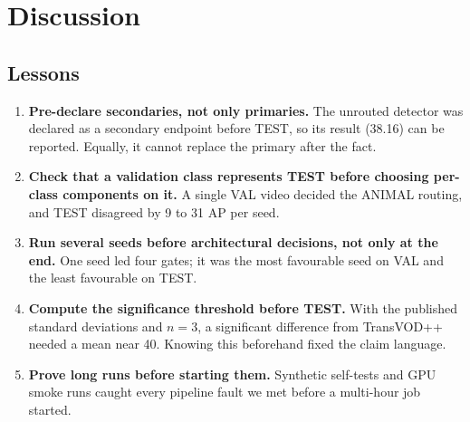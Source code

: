\section{Discussion}\label{sec:discussion}

\subsection{Lessons}
\begin{enumerate}
\item \textbf{Pre-declare secondaries, not only primaries.} The unrouted detector was declared as a secondary endpoint before TEST, so its result (38.16) can be reported. Equally, it cannot replace the primary after the fact.
\item \textbf{Check that a validation class represents TEST before choosing per-class components on it.} A single VAL video decided the ANIMAL routing, and TEST disagreed by 9 to 31 AP per seed.
\item \textbf{Run several seeds before architectural decisions, not only at the end.} One seed led four gates; it was the most favourable seed on VAL and the least favourable on TEST.
\item \textbf{Compute the significance threshold before TEST.} With the published standard deviations and $n = 3$, a significant difference from TransVOD++ needed a mean near 40. Knowing this beforehand fixed the claim language.
\item \textbf{Prove long runs before starting them.} Synthetic self-tests and GPU smoke runs caught every pipeline fault we met before a multi-hour job started.
\end{enumerate}

